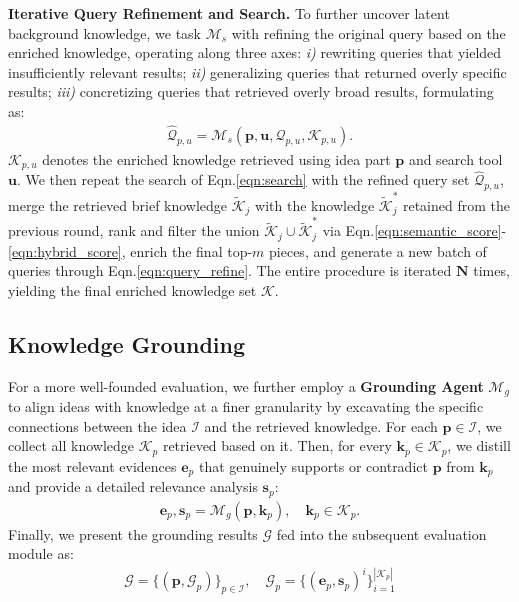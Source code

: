 \textbf{Iterative Query Refinement and Search.}
To further uncover latent background knowledge, we task $\boldsymbol{\mathcal{M}}_s$ with refining the original query based on the enriched knowledge, operating along three axes:
\textit{i)} rewriting queries that yielded insufficiently relevant results;
\textit{ii)} generalizing queries that returned overly specific results;
\textit{iii)} concretizing queries that retrieved overly broad results, formulating as:
\begin{align}
\label{eqn:query_refine}
    \widehat{\boldsymbol{\mathcal{Q}}}_{p,u}=\boldsymbol{\mathcal{M}}_s(\boldsymbol{p},\boldsymbol{u},\boldsymbol{\mathcal{Q}}_{p,u},\boldsymbol{\mathcal{K}}_{p,u}).
\end{align}
$\boldsymbol{\mathcal{K}}_{p,u}$ denotes the enriched knowledge retrieved using idea part $\boldsymbol{p}$ and search tool $\boldsymbol{u}$.
We then repeat the search of Eqn.\ref{eqn:search} with the refined query set $\widehat{\boldsymbol{\mathcal{Q}}}_{p,u}$, merge the retrieved brief knowledge $\boldsymbol{\widetilde{\mathcal{K}}}_j$ with the knowledge $\boldsymbol{\widetilde{\mathcal{K}}}^*_j$ retained from the previous round, rank and filter the union $\boldsymbol{\widetilde{\mathcal{K}}}_j\cup\boldsymbol{\widetilde{\mathcal{K}}}^*_j$ via Eqn.\ref{eqn:semantic_score}-\ref{eqn:hybrid_score}, enrich the final top-$m$ pieces, and generate a new batch of queries through Eqn.\ref{eqn:query_refine}. The entire procedure is iterated $\boldsymbol{N}$ times, yielding the final enriched knowledge set $\boldsymbol{\mathcal{K}}$.

\subsection{Knowledge Grounding}
\label{sec:knowledge_grounding}
For a more well-founded evaluation, we further employ a \textbf{Grounding Agent} $\boldsymbol{\mathcal{M}}_g$ to align ideas with knowledge at a finer granularity by excavating the specific connections between the idea $\boldsymbol{\mathcal{I}}$ and the retrieved knowledge.
For each $\boldsymbol{p}\in\boldsymbol{\mathcal{I}}$, we collect all knowledge $\boldsymbol{\mathcal{K}}_p$ retrieved based on it.
Then, for every $\boldsymbol{k}_p\in\boldsymbol{\mathcal{K}}_p$, we distill the most relevant evidences $\boldsymbol{e}_p$ that genuinely supports or contradict $\boldsymbol{p}$ from $\boldsymbol{k}_p$ and provide a detailed relevance analysis $\boldsymbol{s}_p$:
\begin{align}
    \boldsymbol{e}_p,\boldsymbol{s}_p=\boldsymbol{\mathcal{M}}_g(\boldsymbol{p},\boldsymbol{k}_p),\quad\boldsymbol{k}_p\in\boldsymbol{\mathcal{K}}_p.
\end{align}
Finally, we present the grounding results $\boldsymbol{\mathcal{G}}$ fed into the subsequent evaluation module as:
\begin{align}
    \boldsymbol{\mathcal{G}}=\{(\boldsymbol{p},\boldsymbol{\mathcal{G}}_p)\}_{p\in\boldsymbol{\mathcal{I}}},\quad \boldsymbol{\mathcal{G}}_p=\{(\boldsymbol{e}_p,\boldsymbol{s}_p)^i\}^{|\boldsymbol{\mathcal{K}}_p|}_{i=1}
\end{align}

